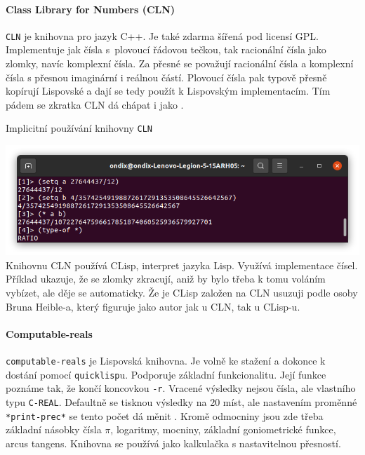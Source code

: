 \paragraph{Class Library for Numbers \cite{wiki:CLN} (CLN)} \texttt{CLN} je knihovna pro jazyk C++. Je také zdarma šířená pod licensí GPL. Implementuje jak čísla s~plovoucí řádovou tečkou, tak racionální čísla jako zlomky, navíc komplexní čísla. Za přesné se považují racionální čísla a komplexní čísla s přesnou imaginární i reálnou částí. Plovoucí čísla pak typově přesně kopírují Lispovské a dají se tedy použít k Lispovským implementacím. Tím pádem se zkratka CLN dá chápat i jako .

\begin{myfigure}{}
\caption{Implicitní používání knihovny \texttt{CLN}}
\includegraphics[width=\linewidth]{./graphics/clisp.png}\label{obr:clisp}
Knihovnu CLN používá CLisp, interpret jazyka Lisp. Využívá implementace čísel. Příklad ukazuje, že se zlomky zkracují, aniž by bylo třeba k tomu voláním vybízet, ale děje se automaticky. Že je CLisp založen na CLN usuzuji podle osoby Bruna Heible-a, který figuruje jako autor jak u CLN, tak u CLisp-u.
\end{myfigure}

\paragraph{Computable-reals \cite{gh:cr}}\label{kap:computable-reals}
\texttt{computable-reals} je Lispovská knihovna. Je volně ke stažení a dokonce k dostání pomocí \texttt{quicklisp}u. Podporuje základní funkcionalitu. Její funkce poznáme tak, že končí koncovkou \texttt{-r}. Vracené výsledky nejsou čísla, ale vlastního typu \texttt{C-REAL}. Defaultně se tisknou výsledky na 20 míst, ale nastavením proměnné \texttt{*print-prec*} se tento počet dá měnit \cite{lpb:numbers}. Kromě odmocniny jsou zde třeba základní násobky čísla $\pi$, logaritmy, mocniny, základní goniometrické funkce, arcus tangens. Knihovna se používá jako kalkulačka s nastavitelnou přesností.

